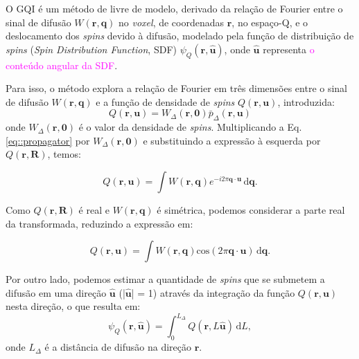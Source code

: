 \documentclass[
    12pt,                %
    oneside,            %
    a4paper,            %
    english,            %
    french,                %
    spanish,            %
    brazil                %
    ]{abntex2}
\begin{document}
O GQI é um método de livre de modelo, derivado da relação de Fourier entre o sinal de difusão $W(\mathbf{r},\mathbf{q})$ no \textit{voxel}, de coordenadas $\mathbf{r}$, no espaço-Q, e o deslocamento dos \textit{spins} devido à difusão, modelado pela função de distribuição de \textit{spins} (\textit{Spin Distribution Function}, SDF) $\psi_Q(\mathbf{r}, \mathbf{\hat{u}})$, onde $\mathbf{\hat{u}}$ representa \textcolor{magenta}{o conteúdo angular da SDF}.

Para isso, o método explora a relação de Fourier em três dimensões entre o sinal de difusão $W(\mathbf{r}, \mathbf{q})$ e a função de densidade de \textit{spins} $Q(\mathbf{r}, \mathbf{u})$, introduzida:
\begin{equation}
\label{eq::spin_densidade_presentacao}
    Q(\mathbf{r}, \mathbf{u}) = W_{\Delta}(\mathbf{r}, \mathbf{0}) \bar{p}_{\Delta}(\mathbf{r}, \mathbf{u})
\end{equation}
onde $W_{\Delta}(\mathbf{r}, \mathbf{0})$ é o valor da densidade de \textit{spins}. Multiplicando a Eq. \ref{eq::propagator} por  $W_{\Delta}(\mathbf{r}, \mathbf{0})$ e substituindo a expressão à esquerda por $Q(\mathbf{r}, \mathbf{R})$, temos:


\begin{equation}
\label{eq::spin_diffsignal_1}
    Q(\mathbf{r}, \mathbf{u}) =
    \int \! W(\mathbf{r}, \mathbf{q})e^{-i2\pi \mathbf{q}\cdot \mathbf{u} } \,\mathrm{d}\mathbf{q} .
\end{equation}

Como $Q(\mathbf{r}, \mathbf{R})$ é real e $W(\mathbf{r}, \mathbf{q})$ é simétrica, podemos considerar a parte real da transformada, reduzindo a expressão em:

\begin{equation}
\label{eq::spin_diffsignal_2}
    Q(\mathbf{r}, \mathbf{u}) =
     \int \! W(\mathbf{r}, \mathbf{q})\text{cos}(2\pi \mathbf{q}\cdot \mathbf{u}) \,\mathrm{d}\mathbf{q} .
\end{equation}

Por outro lado, podemos estimar a quantidade de \textit{spins} que se submetem a difusão em uma direção $\mathbf{\hat{u}}$ (|$\mathbf{\hat{u}}$| = 1) através da integração da função $Q(\mathbf{r}, \mathbf{u})$ nesta direção, o que resulta em:
\begin{equation}
\label{eq::sdf_spin}
    \psi_Q(\mathbf{r}, \mathbf{\hat{u}}) =
   \int_{0}^{L_{\Delta}} Q(\mathbf{r}, L\mathbf{\hat{u}})\!  \,\mathrm{d}L , 
\end{equation}
onde $L_\Delta$ é a distância de difusão na direção  $\mathbf{r}$.
\end{document}

